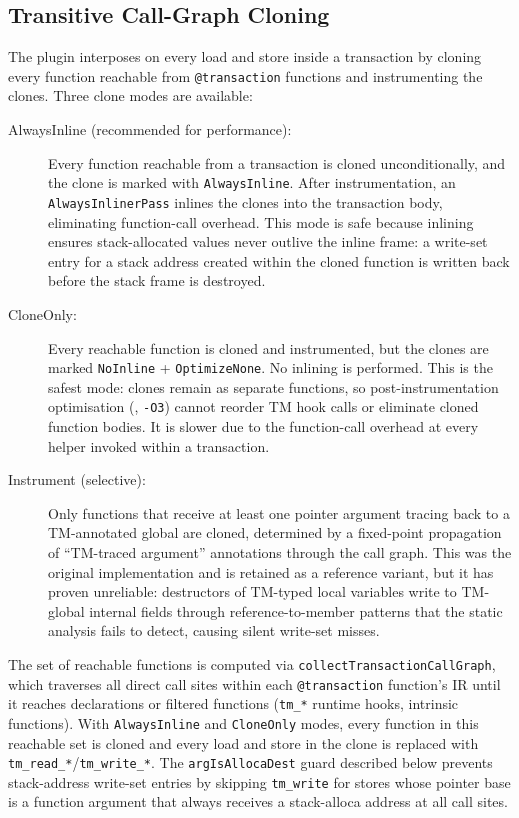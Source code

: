 \documentclass[article,12pt]{article}
\begin{document}
\subsection{Transitive Call-Graph Cloning}
\label{sec:cloning}

The plugin interposes on every load and store inside a transaction
by cloning every function reachable from \texttt{@transaction} functions
and instrumenting the clones.  Three clone modes are available:

\begin{description}
\item[AlwaysInline (recommended for performance):] Every function reachable
  from a transaction is cloned unconditionally, and the clone is marked
  with \texttt{AlwaysInline}.  After instrumentation, an
  \texttt{AlwaysInlinerPass} inlines the clones into the transaction body,
  eliminating function-call overhead.  This mode is safe because inlining
  ensures stack-allocated values never outlive the inline frame: a
  write-set entry for a stack address created within the cloned function
  is written back before the stack frame is destroyed.

\item[CloneOnly:] Every reachable function is cloned and instrumented,
  but the clones are marked \texttt{NoInline} + \texttt{OptimizeNone}.
  No inlining is performed.  This is the safest mode: clones remain as
  separate functions, so post-instrumentation optimisation (\eg,
  \texttt{-O3}) cannot reorder TM hook calls or eliminate cloned
  function bodies.  It is slower due to the function-call overhead at
  every helper invoked within a transaction.

\item[Instrument (selective):] Only functions that receive at least one
  pointer argument tracing back to a TM-annotated global are cloned,
  determined by a fixed-point propagation of ``TM-traced argument''
  annotations through the call graph.  This was the original
  implementation and is retained as a reference variant, but it has
  proven unreliable: destructors of TM-typed local variables write to
  TM-global internal fields through reference-to-member patterns that
  the static analysis fails to detect, causing silent write-set misses.
\end{description}

The set of reachable functions is computed via
\texttt{collectTransactionCallGraph}, which traverses all direct call
sites within each \texttt{@transaction} function's IR until it reaches
declarations or filtered functions (\texttt{tm\_*} runtime hooks,
intrinsic functions).  With \texttt{AlwaysInline} and \texttt{CloneOnly}
modes, every function in this reachable set is cloned and every load
and store in the clone is replaced with \texttt{tm\_read\_*}/\texttt{tm\_write\_*}.  The
\texttt{argIsAllocaDest} guard described below prevents stack-address
write-set entries by skipping \texttt{tm\_write} for stores whose pointer
base is a function argument that always receives a stack-alloca address
at all call sites.
\end{document}
